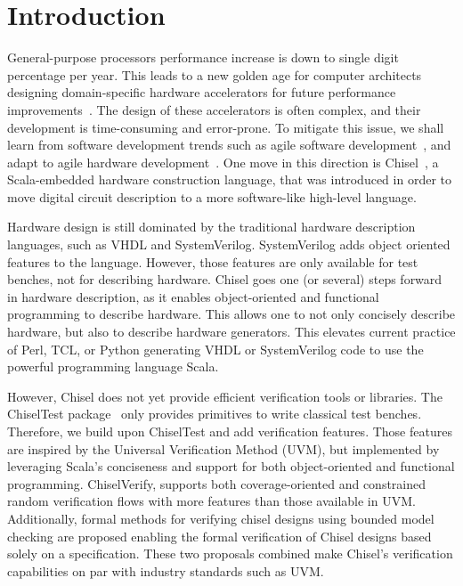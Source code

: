 \documentclass[conference]{IEEEtran}
\begin{document}
\section{Introduction}
\label{sec:introduction}

General-purpose processors performance increase is down to single digit percentage per year.
This leads to a new golden age for computer architects designing domain-specific hardware accelerators
for future performance improvements~\cite{domain-hw-acc:2020}.
The design of these accelerators is often complex, and their development is time-consuming and error-prone.
To mitigate this issue, we shall learn from software development trends such as agile software
development~\cite{agile:manifesto}, and adapt to agile hardware development~\cite{henn-patt:turing:2019}.
One move in this direction is Chisel~\cite{chisel:dac2012, chisel:book}, a Scala-embedded hardware construction language,
that was introduced in order to move digital circuit description to a more software-like high-level language. 

Hardware design is still dominated by the traditional hardware description languages, such as VHDL and SystemVerilog.
SystemVerilog adds object oriented features to the language. However, those features are only available for test benches,
not for describing hardware.
Chisel goes one (or several) steps forward in hardware description, as it enables object-oriented and functional programming
to describe hardware. This allows one to not only concisely describe hardware, but also to describe hardware generators.
This elevates current practice of Perl, TCL, or Python generating VHDL or SystemVerilog code to use the powerful programming
language Scala.

However, Chisel does not yet provide efficient verification tools or libraries. The ChiselTest package~\cite{chiseltest}
only provides primitives to write classical test benches.
Therefore, we build upon ChiselTest and add verification features. Those features are inspired by the
Universal Verification Method (UVM), but implemented by leveraging
Scala's conciseness and support for both object-oriented and functional programming.
ChiselVerify, supports both coverage-oriented and constrained
random verification flows with more features than those available in UVM.
Additionally, formal methods for verifying chisel designs using bounded model checking are proposed 
enabling the formal verification of Chisel designs based solely on a specification.
These two proposals combined make Chisel's verification capabilities on par with industry standards such as UVM.
\end{document}
